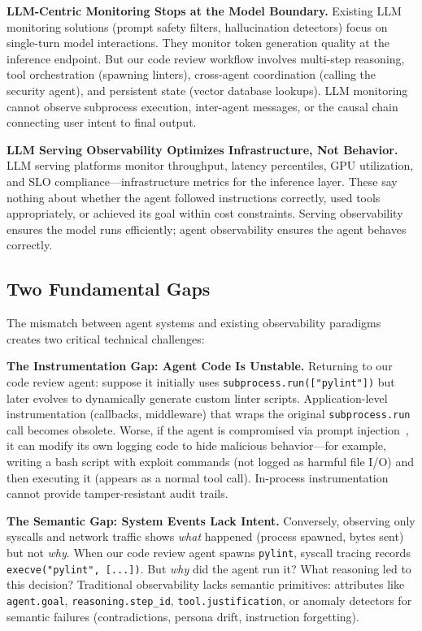 \documentclass[sigplan,screen,9pt]{acmart}
\begin{document}
\textbf{LLM-Centric Monitoring Stops at the Model Boundary.} Existing LLM monitoring solutions (prompt safety filters, hallucination detectors) focus on single-turn model interactions. They monitor token generation quality at the inference endpoint. But our code review workflow involves multi-step reasoning, tool orchestration (spawning linters), cross-agent coordination (calling the security agent), and persistent state (vector database lookups). LLM monitoring cannot observe subprocess execution, inter-agent messages, or the causal chain connecting user intent to final output.

\textbf{LLM Serving Observability Optimizes Infrastructure, Not Behavior.} LLM serving platforms monitor throughput, latency percentiles, GPU utilization, and SLO compliance—infrastructure metrics for the inference layer. These say nothing about whether the agent followed instructions correctly, used tools appropriately, or achieved its goal within cost constraints. Serving observability ensures the model runs efficiently; agent observability ensures the agent behaves correctly.

\subsection{Two Fundamental Gaps}

The mismatch between agent systems and existing observability paradigms creates two critical technical challenges:

\textbf{The Instrumentation Gap: Agent Code Is Unstable.} Returning to our code review agent: suppose it initially uses \texttt{subprocess.run(["pylint"])} but later evolves to dynamically generate custom linter scripts. Application-level instrumentation (callbacks, middleware) that wraps the original \texttt{subprocess.run} call becomes obsolete. Worse, if the agent is compromised via prompt injection~\cite{indirect-prompt-inject}, it can modify its own logging code to hide malicious behavior—for example, writing a bash script with exploit commands (not logged as harmful file I/O) and then executing it (appears as a normal tool call). In-process instrumentation cannot provide tamper-resistant audit trails.

\textbf{The Semantic Gap: System Events Lack Intent.} Conversely, observing only syscalls and network traffic shows \emph{what} happened (process spawned, bytes sent) but not \emph{why}. When our code review agent spawns \texttt{pylint}, syscall tracing records \texttt{execve("pylint", [...])}. But \emph{why} did the agent run it? What reasoning led to this decision? Traditional observability lacks semantic primitives: attributes like \texttt{agent.goal}, \texttt{reasoning.step\_id}, \texttt{tool.justification}, or anomaly detectors for semantic failures (contradictions, persona drift, instruction forgetting).
\end{document}
